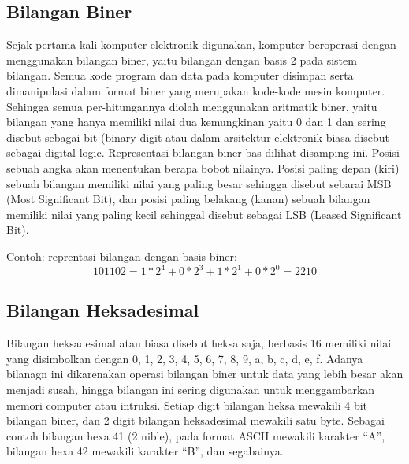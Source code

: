 \subsection{Bilangan Biner}
Sejak pertama kali komputer elektronik digunakan, komputer beroperasi dengan menggunakan bilangan biner, yaitu bilangan dengan basis 2 pada sistem bilangan. Semua kode program dan data pada komputer disimpan serta dimanipulasi dalam format biner yang merupakan kode-kode mesin komputer. Sehingga semua per-hitungannya diolah menggunakan aritmatik biner, yaitu bilangan yang hanya memiliki nilai dua kemungkinan yaitu 0 dan 1 dan sering disebut sebagai bit (binary digit atau dalam arsitektur elektronik biasa disebut sebagai digital logic. Representasi bilangan biner bas dilihat disamping ini. Posisi sebuah angka akan menentukan berapa bobot nilainya. Posisi paling depan (kiri) sebuah bilangan memiliki nilai yang paling besar sehingga disebut sebarai MSB (Most Significant Bit), dan posisi paling belakang (kanan) sebuah bilangan memiliki nilai yang paling kecil sehinggal disebut sebagai LSB (Leased Significant Bit).

Contoh: reprentasi bilangan dengan basis biner:
\begin{equation}
101102 = 1*2^4 + 0*2^3+1*2^1+0*2^0=2210
\end{equation}

\subsection{Bilangan Heksadesimal}
Bilangan heksadesimal atau biasa disebut heksa saja, berbasis 16 memiliki nilai yang disimbolkan dengan 0, 1, 2, 3, 4, 5, 6, 7, 8, 9, a, b, c, d, e, f. Adanya bilanagn ini dikarenakan operasi bilangan biner untuk data yang lebih besar akan menjadi susah, hingga bilangan ini sering digunakan untuk menggambarkan memori computer atau intruksi. Setiap digit bilangan heksa mewakili 4 bit bilangan biner, dan 2 digit bilangan heksadesimal mewakili satu byte.
Sebagai contoh bilangan hexa 41 (2 nible), pada format ASCII mewakili karakter “A”, bilangan hexa 42 mewakili karakter “B”, dan segabainya.
